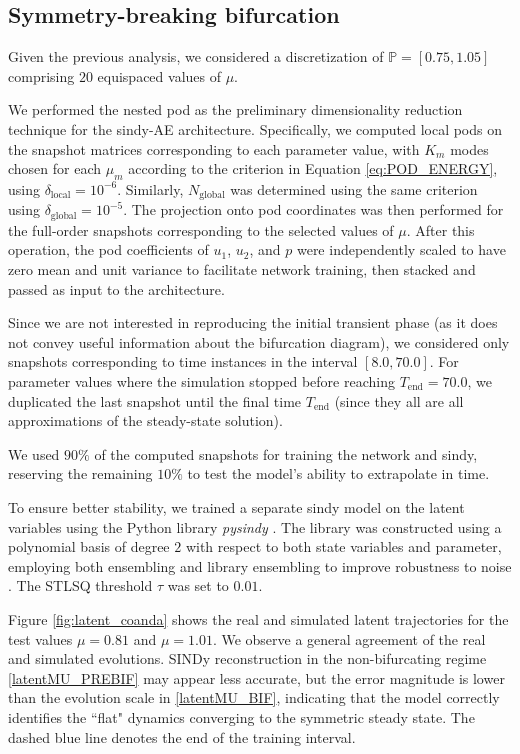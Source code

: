 \documentclass[reqno]{amsart}[standalone]
\theoremstyle{definition}
\theoremstyle{remark}
\begin{document}
\subsection{Symmetry-breaking bifurcation}\label{subsec:coanda_results}
Given the previous analysis, we considered a discretization of $\mathbb{P}=[0.75, 1.05]$ comprising $20$ equispaced values of $\mu$.
%

We performed the nested \gls{pod} as the preliminary dimensionality reduction technique for the \gls{sindy}-AE architecture.
Specifically, we computed local \glspl{pod} on the snapshot matrices corresponding to each parameter value, with $K_m$ modes chosen for each $\mu_m$ according to the criterion in Equation \eqref{eq:POD_ENERGY}, using $\delta_\text{local}=10^{-6}$.
Similarly, $N_\text{global}$ was determined using the same criterion using $\delta_\text{global}=10^{-5}$.
The projection onto \gls{pod} coordinates was then performed for the full-order snapshots corresponding to the selected values of $\mu$.
After this operation, the \gls{pod} coefficients of $u_1$, $u_2$, and $p$ were independently scaled to have zero mean and unit variance to facilitate network training, then stacked and passed as input to the architecture.

Since we are not interested in reproducing the initial transient phase (as it does not convey useful information about the bifurcation diagram), we considered only snapshots corresponding to time instances in the interval $[8.0, 70.0]$.
For parameter values where the simulation stopped before reaching $T_\text{end}=70.0$, we duplicated the last snapshot until the final time $T_\text{end}$ (since they all are all approximations of the steady-state solution).
%

We used $90\%$ of the computed snapshots for training the network and \gls{sindy}, reserving the remaining $10\%$ to test the model's ability to extrapolate in time.

%
To ensure better stability, we trained a separate \gls{sindy} model on the latent variables using the Python library \emph{pysindy} \parencite{PYSINDy1, PYSINDy2}.
The library was constructed using a polynomial basis of degree $2$ with respect to both state variables and parameter, employing both ensembling and library ensembling to improve robustness to noise \parencite{SINDy_ensemble}.
The STLSQ threshold $\tau$ was set to $0.01$.

%


Figure \ref{fig:latent_coanda} shows the real and simulated latent trajectories for the test values $\mu = 0.81$ and $\mu = 1.01$.
We observe a general agreement of the real and simulated evolutions. SINDy reconstruction in the non-bifurcating regime \ref{latentMU_PREBIF} may appear less accurate, but the error magnitude is lower than the evolution scale in \ref{latentMU_BIF}, indicating that the model correctly identifies the ``flat" dynamics converging to the symmetric steady state. The dashed blue line denotes the end of the training interval.
\end{document}
